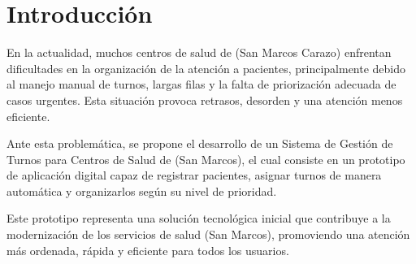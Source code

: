 \section{Introducción}

En la actualidad, muchos centros de salud de (San Marcos Carazo) enfrentan dificultades en la organización de la atención a pacientes, principalmente debido al manejo manual de turnos, largas filas y la falta de priorización adecuada de casos urgentes. Esta situación provoca retrasos, desorden y una atención menos eficiente.

Ante esta problemática, se propone el desarrollo de un Sistema de Gestión de Turnos para Centros de Salud de (San Marcos), el cual consiste en un prototipo de aplicación digital capaz de registrar pacientes, asignar turnos de manera automática y organizarlos según su nivel de prioridad.

Este prototipo representa una solución tecnológica inicial que contribuye a la modernización de los servicios de salud (San Marcos), promoviendo una atención más ordenada, rápida y eficiente para todos los usuarios.

